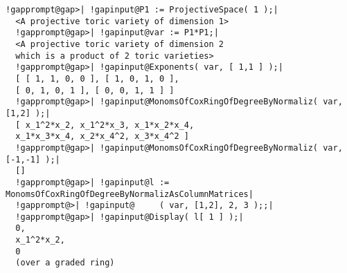 \documentclass[a4paper,11pt]{report}
\begin{document}
{{\begin{Verbatim}[commandchars=!@|,fontsize=\small,frame=single,label=Example]
  !gapprompt@gap>| !gapinput@P1 := ProjectiveSpace( 1 );|
  <A projective toric variety of dimension 1>
  !gapprompt@gap>| !gapinput@var := P1*P1;|
  <A projective toric variety of dimension 2
  which is a product of 2 toric varieties>
  !gapprompt@gap>| !gapinput@Exponents( var, [ 1,1 ] );|
  [ [ 1, 1, 0, 0 ], [ 1, 0, 1, 0 ],
  [ 0, 1, 0, 1 ], [ 0, 0, 1, 1 ] ]
  !gapprompt@gap>| !gapinput@MonomsOfCoxRingOfDegreeByNormaliz( var, [1,2] );|
  [ x_1^2*x_2, x_1^2*x_3, x_1*x_2*x_4,
  x_1*x_3*x_4, x_2*x_4^2, x_3*x_4^2 ]
  !gapprompt@gap>| !gapinput@MonomsOfCoxRingOfDegreeByNormaliz( var, [-1,-1] );|
  []
  !gapprompt@gap>| !gapinput@l := MonomsOfCoxRingOfDegreeByNormalizAsColumnMatrices|
  !gapprompt@>| !gapinput@     ( var, [1,2], 2, 3 );;|
  !gapprompt@gap>| !gapinput@Display( l[ 1 ] );|
  0,
  x_1^2*x_2,
  0
  (over a graded ring)
\end{Verbatim}
 }

 }

   
\end{document}
